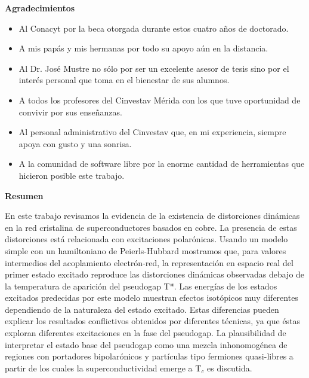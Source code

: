 
\cleardoublepage
{}
{}

\begin{center}
\textbf{\large Agradecimientos}
\end{center}
\vspace{3cm}

\begin{itemize}
    \item Al Conacyt por la beca otorgada durante estos cuatro años de doctorado.
    \item A mis pap\'{a}s y mis hermanas por todo su apoyo a\'{u}n en la distancia.
    \item Al Dr. Jos\'{e} Mustre no s\'{o}lo por ser un excelente asesor de tesis sino por el inter\'{e}s personal que toma en el bienestar de sus alumnos.
    \item A todos los profesores del Cinvestav M\'{e}rida con los que tuve oportunidad de convivir por sus enseñanzas.
    \item Al personal administrativo del Cinvestav que, en mi experiencia, siempre apoya con gusto y una sonrisa.
    \item A la comunidad de software libre por la enorme cantidad de herramientas que hicieron posible este trabajo.
\end{itemize}


\cleardoublepage
{}
{}
\begin{center}
\textbf{\large Resumen}
\end{center}
En este trabajo revisamos la evidencia de la existencia de distorciones din\'{a}micas en la red cristalina de superconductores basados en cobre. La presencia de estas distorciones est\'{a} relacionada con excitaciones polar\'{o}nicas. Usando un modelo simple con un hamiltoniano de Peierls-Hubbard mostramos que, para valores intermedios del acoplamiento electr\'{o}n-red, la representaci\'{o}n en espacio real del primer estado excitado reproduce las distorciones din\'{a}micas observadas debajo de la temperatura de aparici\'{o}n del pseudogap T*. Las energ\'{i}as de los estados excitados predecidas por este modelo muestran efectos isot\'{o}picos muy diferentes dependiendo de la naturaleza del estado excitado. Estas diferencias pueden explicar los resultados conflictivos obtenidos por diferentes t\'{e}cnicas, ya que \'{e}stas exploran diferentes excitaciones en la fase del pseudogap. La plausibilidad de interpretar el estado base del pseudogap como una mezcla inhonomog\'{e}nea de regiones con portadores bipolar\'{o}nicos y part\'{i}culas tipo fermiones quasi-libres a partir de los cuales la superconductividad emerge a T$_c$ es discutida.

